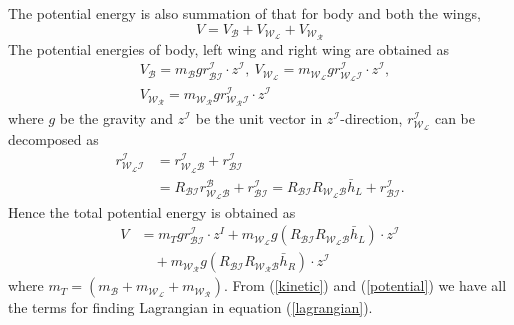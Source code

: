\documentclass[letterpaper, 10 pt, conference]{ieeeconf}  \newcommand{\RN}[1]{\textup{\uppercase\expandafter{\romannumeral#1}}}
\begin{document}
The potential energy is also summation of that for body and both the wings,
\begin{equation}\nonumber
V=V_\mathcal{B}+V_\mathcal{W_L}+V_\mathcal{W_R}
\end{equation}
The potential energies of body, left wing and right wing are obtained as
\begin{align*}
&V_\mathcal{B}=m_\mathcal{B}g r^\mathcal{I}_{\mathcal{B}\mathcal{I}} \cdot z^{\mathcal{I}},~ V_\mathcal{W_L}=m_\mathcal{W_L}g r^\mathcal{I}_{\mathcal{W_L}\mathcal{I}} \cdot z^{\mathcal{I}},\\
&V_\mathcal{W_R}=m_\mathcal{W_R}g r^\mathcal{I}_{\mathcal{W_R}\mathcal{I}} \cdot z^{\mathcal{I}}
\end{align*}
where $g$ be the gravity and $z^{\mathcal{I}}$ be the unit vector in $z^{\mathcal{I}}$-direction, $r^\mathcal{I}_{\mathcal{W_L}}$ can be decomposed as 
\begin{align*}
r^\mathcal{I}_{\mathcal{W_L}\mathcal{I}} &= r^\mathcal{I}_{\mathcal{W_L}\mathcal{B}} + r^\mathcal{I}_{\mathcal{B}\mathcal{I}} \\
&= R_{\mathcal{BI}} r^\mathcal{B}_{\mathcal{W_L}\mathcal{B}} + r^\mathcal{I}_{\mathcal{B}\mathcal{I}}
= R_{\mathcal{B}\mathcal{I}} R_{\mathcal{W_LB}} \bar{h}_L + r^\mathcal{I}_{\mathcal{B}\mathcal{I}}.
\end{align*}
Hence the total potential energy is obtained as
\begin{align}\label{potential}
V&= m_{T}g r^\mathcal{I}_{\mathcal{B}\mathcal{I}} \cdot z^{I} + m_\mathcal{W_L}g(R_{\mathcal{B}\mathcal{I}} R_{\mathcal{W_LB}} \bar{h}_L) \cdot z^{\mathcal{I}} \nonumber \\
& \quad + m_\mathcal{W_R}g(R_{\mathcal{B}\mathcal{I}} R_{\mathcal{W_RB}} \bar{h}_R )\cdot z^{\mathcal{I}}
\end{align}
where $m_{T}= (m_\mathcal{B}+ m_{\mathcal{W_L}} + m_{\mathcal{W_R}})$. From (\ref{kinetic}) and (\ref{potential}) we have all the terms for finding Lagrangian in equation (\ref{lagrangian}).
\end{document}
